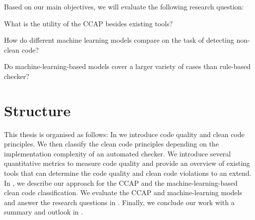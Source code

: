 Based on our main objectives, we will evaluate the following research question:
\begin{description}
    \setlength{\itemsep}{1pt}
    \item[RQ1:] What is the utility of the CCAP besides existing tools? 
    \item[RQ2:] How do different machine learning models compare on the task of detecting non-clean code?
    \item[RQ3:] Do machine-learning-based models cover a larger variety of cases than rule-based checker? 
\end{description}


\section{Structure}
This thesis is organised as follows: In  we introduce code quality and clean code principles. We then classify the clean code principles depending on the implementation complexity of an automated checker. We introduce several quantitative metrics to measure code quality and provide an overview of existing tools that can determine the code quality and clean code violations to an extend. 
In , we describe our approach for the CCAP and the machine-learning-based clean code classification. We evaluate the CCAP and machine-learning models and answer the research questions in . Finally, we conclude our work with a summary and outlook in .